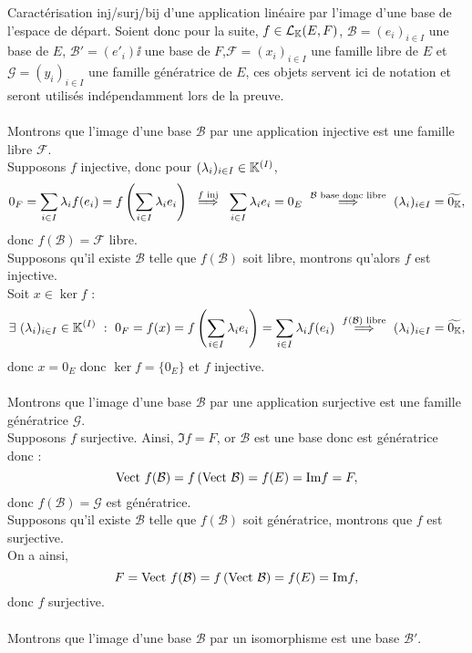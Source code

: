\documentclass{article}
\renewenvironment{question_kholle}[2][ ]
{
	\subsection{\texorpdfstring{#2}{}}
	\notblank{#1}
	{
		\noindent #1
		\bigbreak
	}
	{}
	\begin{proof}
}
{
	\end{proof}
}
\begin{document}
\begin{question_kholle}
	{Caractérisation inj/surj/bij d'une application linéaire par l'image d'une base de l'espace de départ.}
	Soient donc pour la suite, $f \in \mathcal{L}_{\mathbb K}(E,F)$, $\mathcal{B} = (e_i)_{i\in I}$ une base de $E$, $\mathcal{B}' = (e'_i)\ii$ une base de $F$,$\mathcal{F} = (x_i)_{i\in I}$ une famille libre de $E$ et $\mathcal{G} = (y_i)_{i \in I}$ une famille génératrice de $E$, ces objets servent ici de notation et seront utilisés indépendamment lors de la preuve. \\ \\
	Montrons que l'image d'une base $\mathcal{B}$ par une application injective est une famille libre $\mathcal{F}$. \\
	Supposons $f$ injective, donc pour $(\lambda_i)_{i \in I} \in \mathbb K^{(I)}$,
	\[
		0_F = \sum_{i\in  I}\bda_i f(e_i) = f \left( \sum_{i\in  I} \bda_i e_i \right) \ \overset{f \text{ inj}}{\implies} \ \sum_{i\in  I} \bda_i e_i = 0_E \ \overset{\mathcal{B} \text{ base donc libre}}{\implies} \ (\bda _i)_{i\in  I} = \widetilde{0_\K},
	\]
	donc $f(\mathcal{B})= \mathcal{F}$ libre. \\
	Supposons qu'il existe $\mathcal{B}$ telle que $f(\mathcal{B})$ soit libre, montrons qu'alors $f$ est injective. \\
	Soit $x \in \ker f$ :
	\[
		\exists \ (\lambda_i)_{i \in I} \in \mathbb K^{(I)} \ : \ 0_F = f(x) = f\left( \sum_{i \in I} \lambda_i e_i \right) =\sum _{i \in I} \lambda _i f(e_i) \  \overset{f(\mathcal{B}) \text{ libre}}{\implies} \ (\lambda _i)_{i\in  I} = \widetilde{0_{\mathbb K}},
	\]
	donc $x = 0_E$ donc $\ker f = \{0_E\}$ et $f$ injective. \\ \\
	Montrons que l'image d'une base $\mathcal{B}$ par une application surjective est une famille génératrice $\mathcal{G}$. \\
	Supposons $f$ surjective. Ainsi, $\Im f = F$, or $\mathcal{B}$ est une base donc est génératrice donc :
	\[
		\text{Vect } f(\mathcal{B}) = f\left( \text{Vect } \mathcal{B} \right) = f( E) = \text{Im} f = F,
	\]
	donc $f(\mathcal{B}) = \mathcal{G}$ est génératrice. \\
	Supposons qu'il existe $\mathcal{B}$ telle que $f(\mathcal{B})$ soit génératrice, montrons que $f$ est surjective. \\
	On a ainsi,
	\[
		F = \text{Vect } f(\mathcal{B}) = f \left( \text{Vect } \mathcal{B} \right) = f(E) = \text{Im} f,
	\]
	donc $f$ surjective. \\ \\
	Montrons que l'image d'une base $\mathcal{B}$ par un isomorphisme est une base $\mathcal{B}'$. \\

\end{question_kholle}
\end{document}
